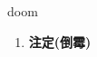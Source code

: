 
\begin{frame}
{\huge doom}
\begin{center}
\begin{enumerate}\Large
  \item \textbf{注定(倒霉)}
\end{enumerate}
\end{center}
\end{frame}
